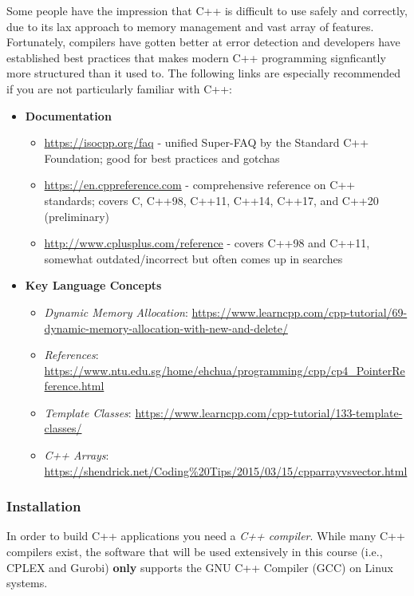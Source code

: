 \documentclass[12pt]{article}
\begin{document}
Some people have the impression that C++ is difficult to use safely and correctly, due to its lax approach to memory management and vast array of features. Fortunately, compilers have gotten better at error detection and developers have established best practices that makes modern C++ programming signficantly more structured than it used to. The following links are especially recommended if you are not particularly familiar with C++:
\begin{itemize}
    \item \textbf{Documentation}
        \begin{itemize}
            \item \url{https://isocpp.org/faq} - unified Super-FAQ by the Standard C++ Foundation; good for best practices and gotchas
            \item \url{https://en.cppreference.com} - comprehensive reference on C++ standards; covers C, C++98, C++11, C++14, C++17, and C++20 (preliminary)
            \item \url{http://www.cplusplus.com/reference} - covers C++98 and C++11, somewhat outdated/incorrect but often comes up in searches
        \end{itemize}
    \item \textbf{Key Language Concepts}
        \begin{itemize}
            \item \textit{Dynamic Memory Allocation}: \url{https://www.learncpp.com/cpp-tutorial/69-dynamic-memory-allocation-with-new-and-delete/}
            \item \textit{References}: \url{https://www.ntu.edu.sg/home/ehchua/programming/cpp/cp4_PointerReference.html}
            \item \textit{Template Classes}: \url{https://www.learncpp.com/cpp-tutorial/133-template-classes/}
            \item \textit{C++ Arrays}: \url{https://shendrick.net/Coding%20Tips/2015/03/15/cpparrayvsvector.html}
        \end{itemize}
\end{itemize}

\subsubsection{Installation}
In order to build C++ applications you need a \emph{C++ compiler}. While many C++ compilers exist, the software that will be used extensively in this course (i.e., CPLEX and Gurobi) \textbf{only} supports the GNU C++ Compiler (GCC) on Linux systems.
\end{document}
